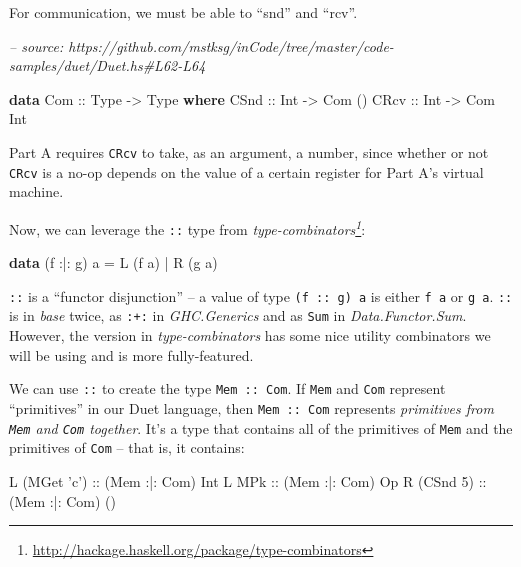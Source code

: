 \documentclass[]{article}
\newenvironment{Shaded}{}{}
\newcommand{\CharTok}[1]{\textcolor[rgb]{0.25,0.44,0.63}{#1}}
\newcommand{\CommentTok}[1]{\textcolor[rgb]{0.38,0.63,0.69}{\textit{#1}}}
\newcommand{\DataTypeTok}[1]{\textcolor[rgb]{0.56,0.13,0.00}{#1}}
\newcommand{\DecValTok}[1]{\textcolor[rgb]{0.25,0.63,0.44}{#1}}
\newcommand{\FunctionTok}[1]{\textcolor[rgb]{0.02,0.16,0.49}{#1}}
\newcommand{\KeywordTok}[1]{\textcolor[rgb]{0.00,0.44,0.13}{\textbf{#1}}}
\newcommand{\NormalTok}[1]{#1}
\newcommand{\OtherTok}[1]{\textcolor[rgb]{0.00,0.44,0.13}{#1}}
\renewcommand{\href}[2]{#2\footnote{\url{#1}}}
\begin{document}
For communication, we must be able to ``snd'' and ``rcv''.

\begin{Shaded}
\begin{Highlighting}[]
\CommentTok{-- source: https://github.com/mstksg/inCode/tree/master/code-samples/duet/Duet.hs#L62-L64}

\KeywordTok{data} \DataTypeTok{Com}\OtherTok{ ::} \DataTypeTok{Type} \OtherTok{->} \DataTypeTok{Type} \KeywordTok{where}
    \DataTypeTok{CSnd}\OtherTok{ ::} \DataTypeTok{Int} \OtherTok{->} \DataTypeTok{Com}\NormalTok{ ()}
    \DataTypeTok{CRcv}\OtherTok{ ::} \DataTypeTok{Int} \OtherTok{->} \DataTypeTok{Com} \DataTypeTok{Int}
\end{Highlighting}
\end{Shaded}

Part A requires \texttt{CRcv} to take, as an argument, a number, since whether
or not \texttt{CRcv} is a no-op depends on the value of a certain register for
Part A's virtual machine.

Now, we can leverage the \texttt{:\textbar{}:} type from
\emph{\href{http://hackage.haskell.org/package/type-combinators}{type-combinators}}:

\begin{Shaded}
\begin{Highlighting}[]
\KeywordTok{data}\NormalTok{ (f }\FunctionTok{:|:}\NormalTok{ g) a }\FunctionTok{=} \DataTypeTok{L}\NormalTok{ (f a)}
                 \FunctionTok{|} \DataTypeTok{R}\NormalTok{ (g a)}
\end{Highlighting}
\end{Shaded}

\texttt{:\textbar{}:} is a ``functor disjunction'' -- a value of type
\texttt{(f\ :\textbar{}:\ g)\ a} is either \texttt{f\ a} or \texttt{g\ a}.
\texttt{:\textbar{}:} is in \emph{base} twice, as \texttt{:+:} in
\emph{GHC.Generics} and as \texttt{Sum} in \emph{Data.Functor.Sum}. However, the
version in \emph{type-combinators} has some nice utility combinators we will be
using and is more fully-featured.

We can use \texttt{:\textbar{}:} to create the type
\texttt{Mem\ :\textbar{}:\ Com}. If \texttt{Mem} and \texttt{Com} represent
``primitives'' in our Duet language, then \texttt{Mem\ :\textbar{}:\ Com}
represents \emph{primitives from \texttt{Mem} and \texttt{Com} together}. It's a
type that contains all of the primitives of \texttt{Mem} and the primitives of
\texttt{Com} -- that is, it contains:

\begin{Shaded}
\begin{Highlighting}[]
\DataTypeTok{L}\NormalTok{ (}\DataTypeTok{MGet} \CharTok{'c'}\NormalTok{)}\OtherTok{ ::}\NormalTok{ (}\DataTypeTok{Mem} \FunctionTok{:|:} \DataTypeTok{Com}\NormalTok{) }\DataTypeTok{Int}
\DataTypeTok{L} \DataTypeTok{MPk}\OtherTok{        ::}\NormalTok{ (}\DataTypeTok{Mem} \FunctionTok{:|:} \DataTypeTok{Com}\NormalTok{) }\DataTypeTok{Op}
\DataTypeTok{R}\NormalTok{ (}\DataTypeTok{CSnd} \DecValTok{5}\NormalTok{)}\OtherTok{   ::}\NormalTok{ (}\DataTypeTok{Mem} \FunctionTok{:|:} \DataTypeTok{Com}\NormalTok{) ()}
\end{Highlighting}
\end{Shaded}
\end{document}
